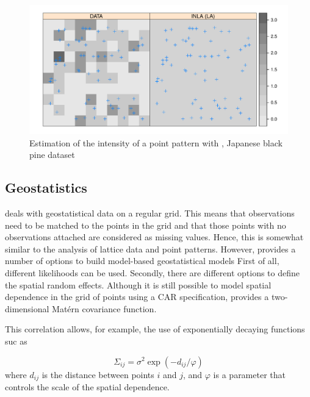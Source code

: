 \documentclass[article]{jss}
\begin{document}
\begin{figure}[h]
\begin{center}
\includegraphics{spatial_inla-008}
\end{center}
\caption{Estimation of the intensity of a point pattern with , 
Japanese black pine dataset}
\label{fig:sppa}
\end{figure}



\subsection{Geostatistics}


 deals with geostatistical data on a regular grid. This means
that observations need to be matched to the points in the grid and that those
points with no observations attached are considered as missing values.
Hence, this is somewhat similar to the analysis of lattice data and point
patterns. However,  provides a number of options to build 
model-based geostatistical models \citet{DiggleRibeiro:2007} First
of all, different likelihoods can be used. Secondly, there are different
options to define the spatial random effects. Although it is still possible
to model spatial dependence in the grid of points using a CAR specification,
 provides a two-dimensional Mat\'ern covariance function. 


This correlation allows, for example, the use of exponentially decaying
functions suc as 

$$
\Sigma_{ij} = \sigma^2 \exp(-d_{ij}/\varphi)
$$
\noindent
where $d_{ij}$ is the distance between points $i$ and $j$, and $\varphi$
is a parameter that controls the scale of the spatial dependence.


%
%
%
\end{document}
